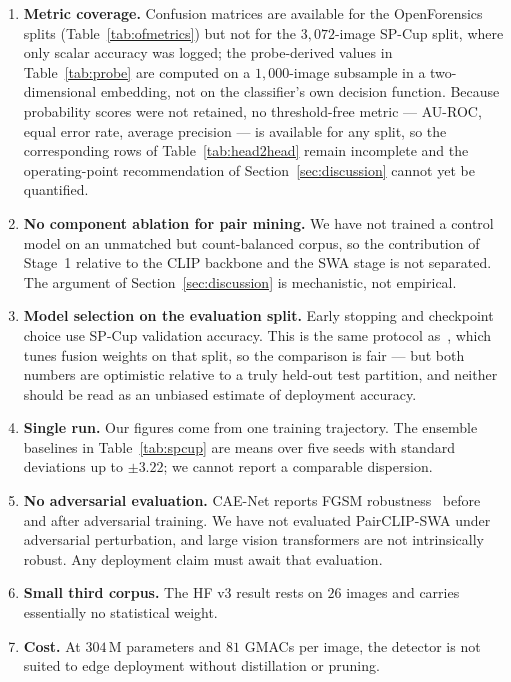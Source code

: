 \documentclass[10pt,journal]{IEEEtran}
\begin{document}
\begin{enumerate}
\item \textbf{Metric coverage.} Confusion matrices are available for the
OpenForensics splits (Table~\ref{tab:ofmetrics}) but not for the
$3{,}072$-image SP-Cup split, where only scalar accuracy was logged; the
probe-derived values in Table~\ref{tab:probe} are computed on a
$1{,}000$-image subsample in a two-dimensional embedding, not on the
classifier's own decision function. Because probability scores were not
retained, no threshold-free metric --- AU-ROC, equal error rate, average
precision --- is available for any split, so the corresponding rows of
Table~\ref{tab:head2head} remain incomplete and the operating-point
recommendation of Section~\ref{sec:discussion} cannot yet be quantified.

\item \textbf{No component ablation for pair mining.} We have not trained a
control model on an unmatched but count-balanced corpus, so the contribution
of Stage~1 relative to the CLIP backbone and the SWA stage is not separated.
The argument of Section~\ref{sec:discussion} is mechanistic, not empirical.

\item \textbf{Model selection on the evaluation split.} Early stopping and
checkpoint choice use SP-Cup validation accuracy. This is the same protocol
as~\cite{bhattacharjee2026caenet}, which tunes fusion weights on that split,
so the comparison is fair --- but both numbers are optimistic relative to a
truly held-out test partition, and neither should be read as an unbiased
estimate of deployment accuracy.

\item \textbf{Single run.} Our figures come from one training trajectory.
The ensemble baselines in Table~\ref{tab:spcup} are means over five seeds with
standard deviations up to $\pm3.22$; we cannot report a comparable dispersion.

\item \textbf{No adversarial evaluation.} CAE-Net reports FGSM
robustness~\cite{goodfellow2015fgsm} before and after adversarial training. We
have not evaluated PairCLIP-SWA under adversarial perturbation, and large
vision transformers are not intrinsically robust. Any deployment claim must
await that evaluation.

\item \textbf{Small third corpus.} The HF v3 result rests on $26$ images and
carries essentially no statistical weight.

\item \textbf{Cost.} At $304$\,M parameters and $81$ GMACs per image, the
detector is not suited to edge deployment without distillation or pruning.
\end{enumerate}
\end{document}
